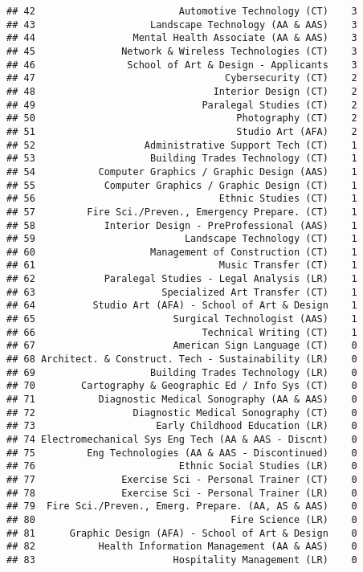 \documentclass[]{article}
\begin{document}
\begin{verbatim}
## 42                         Automotive Technology (CT)    3
## 43                    Landscape Technology (AA & AAS)    3
## 44                 Mental Health Associate (AA & AAS)    3
## 45               Network & Wireless Technologies (CT)    3
## 46                School of Art & Design - Applicants    3
## 47                                 Cybersecurity (CT)    2
## 48                               Interior Design (CT)    2
## 49                             Paralegal Studies (CT)    2
## 50                                   Photography (CT)    2
## 51                                   Studio Art (AFA)    2
## 52                   Administrative Support Tech (CT)    1
## 53                    Building Trades Technology (CT)    1
## 54           Computer Graphics / Graphic Design (AAS)    1
## 55            Computer Graphics / Graphic Design (CT)    1
## 56                                Ethnic Studies (CT)    1
## 57         Fire Sci./Preven., Emergency Prepare. (CT)    1
## 58            Interior Design - PreProfessional (AAS)    1
## 59                          Landscape Technology (CT)    1
## 60                    Management of Construction (CT)    1
## 61                                Music Transfer (CT)    1
## 62            Paralegal Studies - Legal Analysis (LR)    1
## 63                      Specialized Art Transfer (CT)    1
## 64          Studio Art (AFA) - School of Art & Design    1
## 65                        Surgical Technologist (AAS)    1
## 66                             Technical Writing (CT)    1
## 67                        American Sign Language (CT)    0
## 68 Architect. & Construct. Tech - Sustainability (LR)    0
## 69                    Building Trades Technology (LR)    0
## 70        Cartography & Geographic Ed / Info Sys (CT)    0
## 71           Diagnostic Medical Sonography (AA & AAS)    0
## 72                 Diagnostic Medical Sonography (CT)    0
## 73                     Early Childhood Education (LR)    0
## 74 Electromechanical Sys Eng Tech (AA & AAS - Discnt)    0
## 75         Eng Technologies (AA & AAS - Discontinued)    0
## 76                         Ethnic Social Studies (LR)    0
## 77               Exercise Sci - Personal Trainer (CT)    0
## 78               Exercise Sci - Personal Trainer (LR)    0
## 79  Fire Sci./Preven., Emerg. Prepare. (AA, AS & AAS)    0
## 80                                  Fire Science (LR)    0
## 81      Graphic Design (AFA) - School of Art & Design    0
## 82           Health Information Management (AA & AAS)    0
## 83                        Hospitality Management (LR)    0

\end{verbatim}
\end{document}
